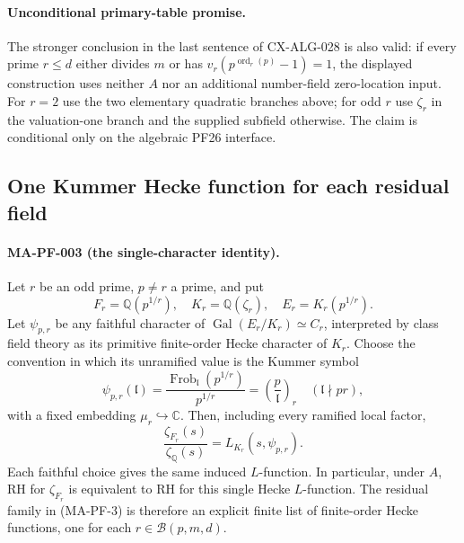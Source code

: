 \paragraph{Unconditional primary-table promise.}
The stronger conclusion in the last sentence of CX-ALG-028 is also
valid: if every prime $r\le d$ either divides $m$ or has
$v_r(p^{\operatorname{ord}_r(p)}-1)=1$, the displayed construction
uses neither $A$ nor an additional number-field zero-location input.
For $r=2$ use the two elementary quadratic branches above; for odd
$r$ use $\zeta_r$ in the valuation-one branch and the supplied
subfield otherwise. The claim is conditional only on the algebraic
PF26 interface.

\subsection{One Kummer Hecke function for each residual field}

\paragraph{MA-PF-003 (the single-character identity).}
Let $r$ be an odd prime, $p\ne r$ a prime, and put
\[
 F_r=\mathbb Q(p^{1/r}),\quad K_r=\mathbb Q(\zeta_r),\quad
 E_r=K_r(p^{1/r}).
\]
Let $\psi_{p,r}$ be any faithful character of
$\operatorname{Gal}(E_r/K_r)\simeq C_r$, interpreted by class field
theory as its primitive finite-order Hecke character of $K_r$.
Choose the convention in which its unramified value is the Kummer
symbol
\[
 \psi_{p,r}(\mathfrak l)
   =\frac{\operatorname{Frob}_{\mathfrak l}(p^{1/r})}{p^{1/r}}
   =\left(\frac{p}{\mathfrak l}\right)_r
   \quad (\mathfrak l\nmid pr),
 \tag{MA-PF-5}
\]
with a fixed embedding $\mu_r\hookrightarrow\mathbb C$. Then,
including every ramified local factor,
\[
 \boxed{\displaystyle
   \frac{\zeta_{F_r}(s)}{\zeta_{\mathbb Q}(s)}
     =L_{K_r}(s,\psi_{p,r}) .}
 \tag{MA-PF-6}
\]
Each faithful choice gives the same induced $L$-function. In particular,
under $A$, RH for $\zeta_{F_r}$ is equivalent to RH for this single
Hecke $L$-function. The residual family in (MA-PF-3) is therefore an
explicit finite list of finite-order Hecke functions, one for each
$r\in\mathcal B(p,m,d)$.

